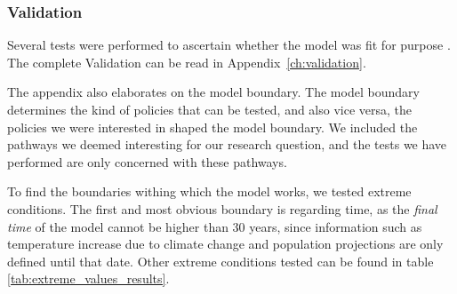 
\subsubsection{Validation}    


Several tests were performed to ascertain whether the model was fit for purpose \parencite{forrester_tests_1980}. The complete Validation can be read in Appendix~\ref{ch:validation}.

The appendix also elaborates on the model boundary. The model boundary determines the kind of policies that can be tested, and also vice versa, the policies we were interested in shaped the model boundary. We included the pathways we deemed interesting for our research question, and the tests we have performed are only concerned with these pathways.

To find the boundaries withing which the model works, we tested extreme conditions. The first and most obvious boundary is regarding time, as the \textit{final time} of the model cannot be higher than 30 years, since information such as temperature increase due to climate change and population projections are only defined until that date. Other extreme conditions tested can be found in table \ref{tab:extreme_values_results}.

